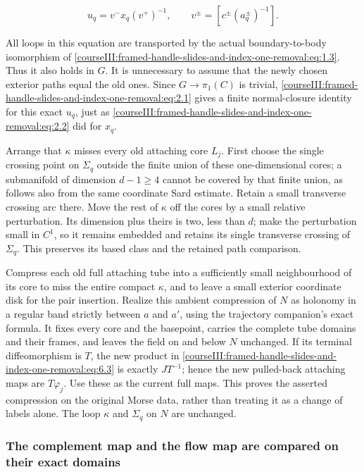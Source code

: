 \begin{equation}
u_q=v^-x_q(v^+)^{-1},\qquad
 v^\pm=[c^\pm(a_q^\pm)^{-1}].
 \label{courseIII:framed-handle-slides-and-index-one-removal:eq:6.6}
\end{equation}

All loops in this equation are transported by the actual boundary-to-body isomorphism of \eqref{courseIII:framed-handle-slides-and-index-one-removal:eq:1.3}. Thus it also holds in \(G\). It is unnecessary to assume that the newly chosen exterior paths equal the old ones. Since \(G\to\pi_1(C)\) is trivial, \eqref{courseIII:framed-handle-slides-and-index-one-removal:eq:2.1} gives a finite normal-closure identity for this exact \(u_q\), just as \eqref{courseIII:framed-handle-slides-and-index-one-removal:eq:2.2} did for \(x_q\).

Arrange that \(\kappa\) misses every old attaching core \(L_j\). First choose the single crossing point on \(\Sigma_q\) outside the finite union of these one-dimensional cores; a submanifold of dimension \(d-1\geq4\) cannot be covered by that finite union, as follows also from the same coordinate Sard estimate. Retain a small transverse crossing arc there. Move the rest of \(\kappa\) off the cores by a small relative perturbation. Its dimension plus theirs is two, less than \(d\); make the perturbation small in \(C^1\), so it remains embedded and retains its single transverse crossing of \(\Sigma_q\). This preserves its based class and the retained path comparison.

Compress each old full attaching tube into a sufficiently small neighbourhood of its core to miss the entire compact \(\kappa\), and to leave a small exterior coordinate disk for the pair insertion. Realize this ambient compression of \(N\) as holonomy in a regular band strictly between \(a\) and \(a'\), using the trajectory companion's exact formula. It fixes every core and the basepoint, carries the complete tube domains and their frames, and leaves the field on and below \(N\) unchanged. If its terminal diffeomorphism is \(T\), the new product in \eqref{courseIII:framed-handle-slides-and-index-one-removal:eq:6.3} is exactly \(JT^{-1}\); hence the new pulled-back attaching maps are \(T\varphi_j\). Use these as the current full maps. This proves the asserted compression on the original Morse data, rather than treating it as a change of labels alone. The loop \(\kappa\) and \(\Sigma_q\) on \(N\) are unchanged.

\subsubsection{The complement map and the flow map are compared on their exact domains}
\label{courseIII:framed-handle-slides-and-index-one-removal:section-6.3}

